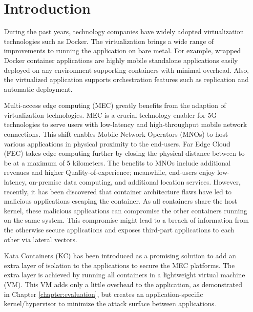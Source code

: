 \chapter{Introduction}
\label{chapter:intro}



During the past years, technology companies have widely adopted virtualization technologies such as Docker. The virtualization brings a wide range of improvements to running the application on bare metal. For example, wrapped Docker container applications are highly mobile standalone applications easily deployed on any environment supporting containers with minimal overhead. Also, the virtualized application supports orchestration features such as replication and automatic deployment.

Multi-access edge computing (MEC) greatly benefits from the adaption of virtualization technologies. MEC is a crucial technology enabler for 5G technologies to serve users with low-latency and high-throughput mobile network connections. This shift enables Mobile Network Operators (MNOs) to host various applications in physical proximity to the end-users. Far Edge Cloud (FEC) takes edge computing further by closing the physical distance between to be at a maximum of 5 kilometers. The benefits to MNOs include additional revenues and higher Quality-of-experience; meanwhile, end-users enjoy low-latency, on-premise data computing, and additional location services. However, recently, it has been discovered that container architecture flaws have led to malicious applications escaping the container. As all containers share the host kernel, these malicious applications can compromise the other containers running on the same system. This compromise might lead to a breach of information from the otherwise secure applications and exposes third-part applications to each other via lateral vectors.

Kata Containers (KC) \cite{KataContainers} has been introduced as a promising solution to add an extra layer of isolation to the applications to secure the MEC platforms. The extra layer is achieved by running all containers in a lightweight virtual machine (VM). This VM adds only a little overhead to the application, as demonstrated in Chapter \ref{chapter:evaluation}, but creates an application-specific kernel/hypervisor to minimize the attack surface between applications.

